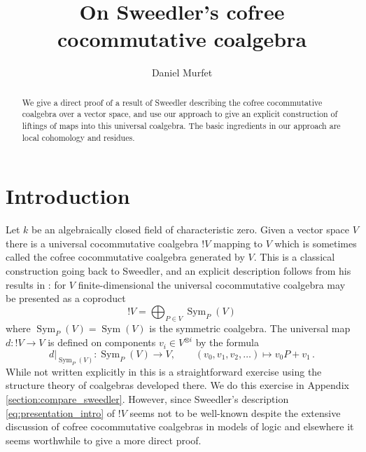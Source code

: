 \documentclass[english,letter paper,12pt,reqno]{article}
\theoremstyle{example}
\numberwithin{equation}{section}
\def\res{\operatorname{Res}}
\DeclareMathOperator{\Sym}{Sym}
\begin{document}
\def\ScoreOverhang{1pt}

\def\Res{\res\!}
\newcommand{\ud}[1]{\operatorname{d}\!{#1}}
\newcommand{\Ress}[1]{\res_{#1}\!}
\newcommand{\cat}[1]{\mathcal{#1}}
\newcommand{\lto}{\longrightarrow}
\newcommand{\xlto}[1]{\stackrel{#1}\lto}
\newcommand{\mf}[1]{\mathfrak{#1}}
\newcommand{\md}[1]{\mathscr{#1}}
\newcommand{\church}[1]{\underline{#1}}
\newcommand{\prf}[1]{\underline{#1}}
\newcommand{\den}[1]{\llbracket #1 \rrbracket}
\def\l{\,|\,}
\def\sgn{\textup{sgn}}
\def\cont{\operatorname{cont}}

\title{On Sweedler's cofree cocommutative coalgebra}
\author{Daniel Murfet}

\maketitle

\begin{abstract} We give a direct proof of a result of Sweedler describing the cofree cocommutative coalgebra over a vector space, and use our approach to give an explicit construction of liftings of maps into this universal coalgebra. The basic ingredients in our approach are local cohomology and residues.
\end{abstract}

\section{Introduction}

Let $k$ be an algebraically closed field of characteristic zero. Given a vector space $V$ there is a universal cocommutative coalgebra ${!}V$ mapping to $V$ which is sometimes called the cofree cocommutative coalgebra generated by $V$. This is a classical construction going back to Sweedler, and an explicit description follows from his results in \cite{sweedler}: for $V$ finite-dimensional the universal cocommutative coalgebra may be presented as a coproduct
\begin{equation}\label{eq:presentation_intro}
{!} V = \bigoplus_{P \in V} \Sym_P(V)
\end{equation}
where $\Sym_P(V) = \Sym(V)$ is the symmetric coalgebra. The universal map $d: {!} V \lto V$ is defined on components $v_i \in V^{\otimes i}$ by the formula
\[
d|_{\Sym_P(V)}: \Sym_P(V) \lto V, \qquad (v_0,v_1,v_2,\ldots) \longmapsto v_0 P + v_1\,.
\]
While not written explicitly in \cite{sweedler} this is a straightforward exercise using the structure theory of coalgebras developed there. We do this exercise in Appendix \ref{section:compare_sweedler}. However, since Sweedler's description \eqref{eq:presentation_intro} of ${!} V$ seems not to be well-known despite the extensive discussion of cofree cocommutative coalgebras in models of logic \cite{blute,hyland,mellies2,schreiber} and elsewhere it seems worthwhile to give a more direct proof. 
\end{document}

